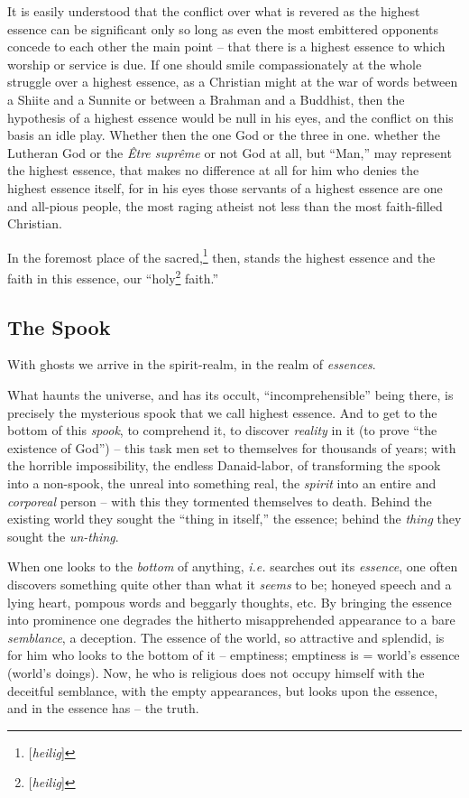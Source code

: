 It is easily understood that the conflict over what is revered as the highest 
essence can be significant only so long as even the most embittered opponents 
concede to each other the main point -- that there is a highest essence to 
which worship or service is due. If one should smile compassionately at the 
whole struggle over a highest essence, as a Christian might at the war of 
words between a Shiite and a Sunnite or between a Brahman and a Buddhist, then 
the hypothesis of a highest essence would be null in his eyes, and the 
conflict on this basis an idle play. Whether then the one God or the three in 
one. whether the Lutheran God or the \textit{\^Etre supr\^eme} or not God at 
all, but ``Man,'' may represent the highest essence, that makes no 
difference at all for him who denies the highest essence itself, for in his 
eyes those servants of a highest essence are one and all-pious people, the 
most raging atheist not less than the most faith-filled Christian.

In the foremost place of the sacred,\footnote{[\textit{heilig}]} then, stands 
the highest essence and the faith in this essence, our 
``holy\footnote{[\textit{heilig}]} faith.''

\medskip{}

\subsection[The Spook]{\centering The Spook}

With ghosts we arrive in the spirit-realm, in the realm of \textit{essences}.

What haunts the universe, and has its occult, ``incomprehensible'' being 
there, is precisely the mysterious spook that we call highest essence. And to 
get to the bottom of this \textit{spook}, to comprehend it, to discover 
\textit{reality} in it (to prove ``the existence of God'') -- this task men 
set to themselves for thousands of years; with the horrible impossibility, the 
endless Danaid-labor, of transforming the spook into a non-spook, the unreal 
into something real, the \textit{spirit} into an entire and \textit{corporeal} 
person -- with this they tormented themselves to death. Behind the existing 
world they sought the ``thing in itself,'' the essence; behind the 
\textit{thing} they sought the \textit{un-thing}.

When one looks to the \textit{bottom} of anything, \textit{i.e.} searches out 
its \textit{essence}, one often discovers something quite other than what it 
\textit{seems} to be; honeyed speech and a lying heart, pompous words and 
beggarly thoughts, etc. By bringing the essence into prominence one degrades 
the hitherto misapprehended appearance to a bare \textit{semblance}, a 
deception. The essence of the world, so attractive and splendid, is for him 
who looks to the bottom of it -- emptiness; emptiness is = world's essence 
(world's doings). Now, he who is religious does not occupy himself with the 
deceitful semblance, with the empty appearances, but looks upon the essence, 
and in the essence has -- the truth.

